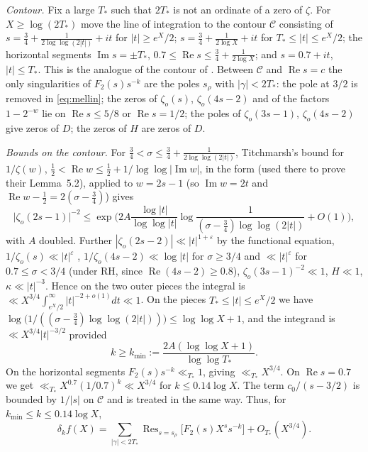 \documentclass[11pt]{amsart}
\theoremstyle{remark}
\newcommand{\zo}{\zeta_{o}}
\DeclareMathOperator{\Res}{Res}
\begin{document}
\emph{Contour.} Fix a large $T_*$ such that $2T_*$ is not an ordinate of a zero of $\zeta$. For $X\ge\log(2T_*)$ move the line of integration to the contour $\mathcal C$ consisting of $s=\tfrac34+\frac1{2\log\log(2|t|)}+it$ for $|t|\ge e^X/2$; $s=\tfrac34+\frac1{2\log X}+it$ for $T_*\le|t|\le e^X/2$; the horizontal segments $\operatorname{Im}s=\pm T_*$, $0.7\le\operatorname{Re}s\le\tfrac34+\frac1{2\log X}$; and $s=0.7+it$, $|t|\le T_*$. This is the analogue of the contour of \cite[\S5.1]{KW09}. Between $\mathcal C$ and $\operatorname{Re}s=c$ the only singularities of $F_2(s)s^{-k}$ are the poles $s_\rho$ with $|\gamma|<2T_*$: the pole at $3/2$ is removed in \eqref{eq:mellin}; the zeros of $\zo(s)$, $\zo(4s-2)$ and of the factors $1-2^{-w}$ lie on $\operatorname{Re}s\le5/8$ or $\operatorname{Re}s=1/2$; the poles of $\zo(3s-1)$, $\zo(4s-2)$ give zeros of $D$; the zeros of $H$ are zeros of $D$.

\emph{Bounds on the contour.} For $\tfrac34<\sigma\le\tfrac34+\frac1{2\log\log(2|t|)}$, Titchmarsh's bound \cite[Thm.~14.14(B)]{T} for $1/\zeta(w)$, $\tfrac12<\operatorname{Re}w\le\tfrac12+1/\log\log|\operatorname{Im}w|$, in the form \cite[(5.3)]{KW09} (used there to prove their Lemma~5.2), applied to $w=2s-1$ (so $\operatorname{Im}w=2t$ and $\operatorname{Re}w-\tfrac12=2(\sigma-\tfrac34)$) gives
\[
\big|\zo(2s-1)\big|^{-2}\le\exp\Big(2A\frac{\log|t|}{\log\log|t|}\log\frac{1}{(\sigma-\frac34)\log\log(2|t|)}+O(1)\Big),
\]
with $A$ doubled. Further $|\zo(2s-2)|\ll|t|^{1+\varepsilon}$ by the functional equation, $1/\zo(s)\ll|t|^\varepsilon$ \cite[\S14.2]{T}, $1/\zo(4s-2)\ll\log|t|$ for $\sigma\ge3/4$ and $\ll|t|^\varepsilon$ for $0.7\le\sigma<3/4$ (under RH, since $\operatorname{Re}(4s-2)\ge0.8$), $\zo(3s-1)^{-2}\ll1$, $H\ll1$, $\kappa\ll|t|^{-3}$. Hence on the two outer pieces the integral is $\ll X^{3/4}\int_{e^X/2}^\infty|t|^{-2+o(1)}dt\ll1$. On the pieces $T_*\le|t|\le e^X/2$ we have $\log\big(1/((\sigma-\frac34)\log\log(2|t|))\big)\le\log\log X+1$, and the integrand is $\ll X^{3/4}|t|^{-3/2}$ provided
\[
k\ge k_{\min}:=\frac{2A(\log\log X+1)}{\log\log T_*}.
\]
On the horizontal segments $F_2(s)s^{-k}\ll_{T_*}1$, giving $\ll_{T_*}X^{3/4}$. On $\operatorname{Re}s=0.7$ we get $\ll_{T_*}X^{0.7}(1/0.7)^k\ll X^{3/4}$ for $k\le0.14\log X$. The term $c_0/(s-3/2)$ is bounded by $1/|s|$ on $\mathcal C$ and is treated in the same way. Thus, for $k_{\min}\le k\le0.14\log X$,
\begin{equation}\label{eq:deltak}
\delta_kf(X)=\sum_{|\gamma|<2T_*}\Res_{s=s_\rho}\big[F_2(s)X^ss^{-k}\big]+O_{T_*}(X^{3/4}).
\end{equation}
\end{document}

